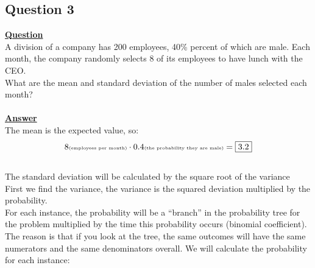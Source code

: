 \documentclass[a4, 12pt,titlepage]{scrartcl}
\begin{document}
\subsection{Question 3}
\textbf{\underline{Question}}\\
A division of a company has 200 employees, 40\% percent of which are male. Each month, the company randomly selects 8 of its employees to have lunch with the CEO.\\
What are the mean and standard deviation of the number of males selected each
month?\\
\smallskip\\
\textbf{\underline{Answer}}\\
The mean is the expected value, so:\[
8\textrm{\tiny (employees per month)}\cdot 0.4\textrm{\tiny (the probability they are male)}=\boxed{3.2}\]\\
The standard deviation will be calculated by the square root of the variance \\
First we find the variance, the variance is the squared deviation multiplied by the probability.\\
For each instance, the probability will be a ``branch'' in the probability tree for the problem multiplied by the time this probability occurs (binomial coefficient).\\
The reason is that if you look at the tree, the same outcomes will have the same numerators and the same denominators overall.
We will calculate the probability for each instance:\\
\end{document}
